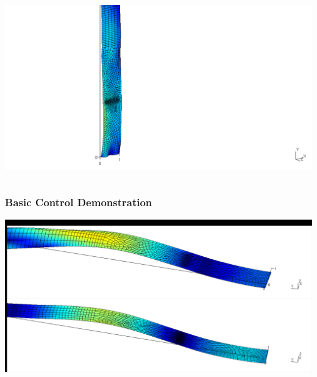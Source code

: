\documentclass[9pt]{beamer}
\begin{document}
\begin{frame}
\begin{columns}

\href{run:ParaStudy_onlydata/RandomLoad/Dynamic_Rad1.mpg}{\includegraphics[width=1.0\textwidth,trim={11cm 0cm 22cm 0cm},clip]{ParaStudy_onlydata/RandomLoad/Dynamic_Rad1.png}}
\end{columns}
\end{frame}


\begin{frame}
\frametitle{Basic Control Demonstration}
\href{run:control_demo.mpg}{\includegraphics[width=1.0\textwidth,trim={0.5cm 11cm 0.1cm 1cm},clip]{control_demo.png}}

\begin{figure}[h!]
\centering

\end{figure}

\end{frame}
\end{document}
